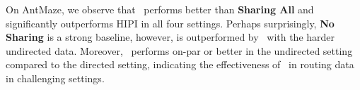 
On AntMaze, we observe that \cdsmethodname\ performs better than \textbf{Sharing All} and significantly outperforms HIPI in all four settings. Perhaps surprisingly, \textbf{No Sharing} is a strong baseline, however, is outperformed by \cdsmethodname\ with the harder undirected data. Moreover, \cdsmethodname\ performs on-par or better in the undirected setting compared to the directed setting, indicating the effectiveness of \cdsmethodname\ in routing data in challenging settings. 
















